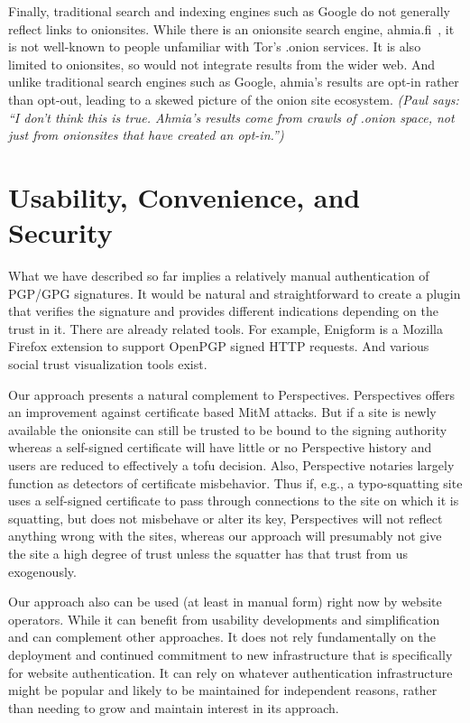 \documentclass[10pt, conference, compsocconf]{styles/IEEEtran}
\newcommand{\paul}[1]{{\color{red}\em (Paul says: ``#1'')}}
\begin{document}
Finally, traditional search and indexing engines such as Google do
not generally reflect links to onionsites. While there is an onionsite
search engine, ahmia.fi~\cite{ahmia}, it is not well-known to
people unfamiliar with Tor's .onion services. It is also limited to
onionsites, so would not integrate results from the wider web.  And 
unlike traditional search engines such as Google, ahmia's results are 
opt-in rather than opt-out, leading to a skewed picture of the onion 
site ecosystem.
\paul{I don't think this is true. Ahmia's results come from
crawls of .onion space, not just from onionsites that have created
an opt-in.}

\section{Usability, Convenience, and Security}

What we have described so far implies a relatively manual
authentication of PGP/GPG signatures. It would be natural and
straightforward to create a plugin that verifies the signature
and provides different indications depending on the trust in it.
There are already related tools. For example, Enigform is a
Mozilla Firefox extension to support OpenPGP signed HTTP requests.
And various social trust visualization tools exist.

Our approach presents a natural complement to Perspectives.
Perspectives offers an improvement against
certificate based MitM attacks. But if a site is newly available
the onionsite can still be trusted to be bound to the signing
authority whereas a self-signed certificate will have little or no
Perspective history and users are reduced to effectively a tofu
decision. Also, Perspective notaries largely function as
detectors of certificate misbehavior. 
Thus if, e.g., a typo-squatting site uses a self-signed certificate to
pass through connections to the site on which it is squatting, but
does not misbehave or alter its key, Perspectives will not reflect
anything wrong with the sites, whereas our approach will presumably
not give the site a high degree of trust unless the squatter has
that trust from us exogenously.

Our approach also can be used (at least in manual form) right now by
website operators. While it can benefit from usability developments
and simplification and can complement other approaches. It does not
rely fundamentally on the deployment and continued commitment to new
infrastructure that is specifically for website authentication.  It
can rely on whatever authentication infrastructure might be popular
and likely to be maintained for independent reasons, rather than
needing to grow and maintain interest in its approach.
\end{document}
